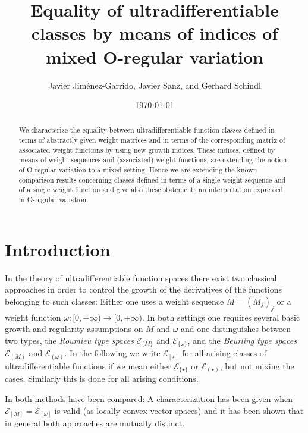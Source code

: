 \documentclass[10pt]{amsart}%
\title[Equality of ultradifferentiable classes by means of indices]
{Equality of ultradifferentiable classes by means of indices of mixed O-regular variation}
\author[J. Jim\'{e}nez-Garrido, J. Sanz, and G.~Schindl]{Javier Jim\'{e}nez-Garrido, Javier Sanz, and Gerhard Schindl}
\numberwithin{equation}{section}
\theoremstyle{plain}
\begin{document}
\begin{abstract}
We characterize the equality between ultradifferentiable function classes defined in terms of abstractly given weight matrices and in terms of the corresponding matrix of associated weight functions by using new growth indices. These indices, defined by means of weight sequences and (associated) weight functions, are extending the notion of O-regular variation to a mixed setting. Hence we are extending the known comparison results concerning classes defined in terms of a single weight sequence and of a single weight function and give also these statements an interpretation expressed in O-regular variation.
\end{abstract}

\date{\today}

\maketitle

\section{Introduction}\label{Introduction}
In the theory of ultradifferentiable function spaces there exist two classical approaches in order to control the growth of the derivatives of the functions belonging to such classes: Either one uses a weight sequence $M=(M_j)_j$ or a weight function $\omega:[0,+\infty)\rightarrow[0,+\infty)$. In both settings one requires several basic growth and regularity assumptions on $M$ and $\omega$ and one distinguishes between two types, the {\itshape Roumieu type spaces} $\mathcal{E}_{\{M\}}$ and $\mathcal{E}_{\{\omega\}}$, and the {\itshape Beurling type spaces} $\mathcal{E}_{(M)}$ and $\mathcal{E}_{(\omega)}$. In the following we write $\mathcal{E}_{[\star]}$ for all arising classes of ultradifferentiable functions if we mean either $\mathcal{E}_{\{\star\}}$ or $\mathcal{E}_{(\star)}$, but not mixing the cases. Similarly this is done for all arising conditions.\vspace{6pt}

In \cite{BonetMeiseMelikhov07} both methods have been compared: A characterization has been given when $\mathcal{E}_{[M]}=\mathcal{E}_{[\omega]}$ is valid (as locally convex vector spaces) and it has been shown that in general both approaches are mutually distinct.\vspace{6pt}
\end{document}
